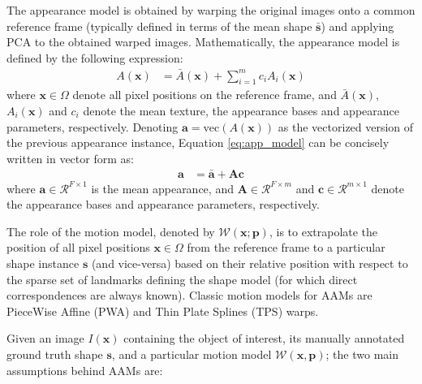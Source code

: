 The appearance model is obtained by warping the original images onto a common reference frame (typically defined in terms of the mean shape $\mathbf{\bar{s}}$) and applying PCA to the obtained warped images. Mathematically, the appearance model is defined by the following expression:
\begin{equation}
	\begin{aligned}
		A(\mathbf{x}) & = \bar{A}(\mathbf{x}) + \sum_{i=1}^m c_i A_i(\mathbf{x})
	\end{aligned}
    \label{eq:app_model}
\end{equation}
where $\mathbf{x} \in \Omega$ denote all pixel positions on the reference frame, and $\bar{A}(\mathbf{x})$, $A_i(\mathbf{x})$ and $c_i$ denote the mean texture, the appearance bases and appearance parameters, respectively. Denoting $\mathbf{a} = \text{vec}(A(\mathbf{x}))$ as the vectorized version of the previous appearance instance, Equation \ref{eq:app_model} can be concisely written in vector form as:
\begin{equation}
	\begin{aligned}
		\mathbf{a} & = \mathbf{\bar{a}} + \mathbf{A} \mathbf{c}
	\end{aligned}
    \label{eq:app_model_vec}
\end{equation}
where $\mathbf{a} \in \mathcal{R}^{F \times 1}$ is the mean appearance, and $\mathbf{A} \in  \mathcal{R}^{F \times  m}$ and $\mathbf{c} \in \mathcal{R}^{m \times 1}$ denote the appearance bases and appearance parameters, respectively.

The role of the motion model, denoted by $\mathcal{W}(\mathbf{x}; \mathbf{p})$, is to extrapolate the position of all pixel positions $\mathbf{x} \in \Omega$ from the reference frame to a particular shape instance $\mathbf{s}$ (and vice-versa) based on their relative position with respect to the sparse set of landmarks defining the shape model (for which direct correspondences are always known). Classic motion models for AAMs are PieceWise Affine (PWA) \cite{Cootes2004,Matthews2004} and Thin Plate Splines (TPS) \cite{Cootes2004,Papandreou2008} warps. 

Given an image $I(\mathbf{x})$ containing the object of interest, its manually annotated ground truth shape $\mathbf{s}$, and a particular motion model $\mathcal{W}(\mathbf{x}, \mathbf{p})$; the two main assumptions behind AAMs are:

